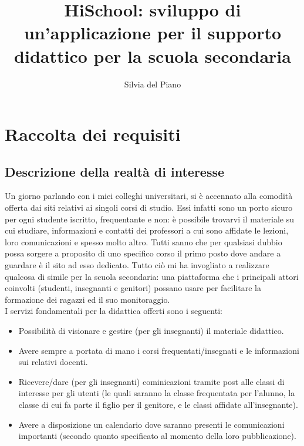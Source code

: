 \documentclass[Lau, binding=0.6cm, oneside]{sapthesis}
\title{HiSchool: sviluppo di un'applicazione per il supporto didattico per la scuola secondaria}
\author{Silvia del Piano}
\begin{document}
\frontmatter

\maketitle

\dedication{}

\tableofcontents

\mainmatter

\chapter{Raccolta dei requisiti}

\section{Descrizione della realtà di interesse}

Un giorno parlando con i miei colleghi universitari, si è accennato alla comodità offerta dai siti relativi ai singoli corsi di studio. Essi infatti sono un porto sicuro per ogni studente iscritto, frequentante e non: è possibile trovarvi il materiale su cui studiare, informazioni e contatti dei professori a cui sono affidate le lezioni, loro comunicazioni e spesso molto altro. Tutti sanno che per qualsiasi dubbio possa sorgere a proposito di uno specifico corso il primo posto dove andare a guardare è il sito ad esso dedicato. Tutto ciò mi ha invogliato a realizzare qualcosa di simile per la scuola secondaria: una piattaforma che i principali attori coinvolti (studenti, insegnanti e genitori) possano usare per facilitare la formazione dei ragazzi ed il suo monitoraggio.\\
I servizi fondamentali per la didattica offerti sono i seguenti:
\begin{itemize}
	\item Possibilità di visionare e gestire (per gli insegnanti) il materiale didattico.
	\item Avere sempre a portata di mano i corsi frequentati/insegnati e le informazioni sui relativi docenti.
	\item Ricevere/dare (per gli insegnanti) cominicazioni tramite post alle classi di interesse per gli utenti (le quali saranno la classe frequentata per l'alunno, la classe di cui fa parte il figlio per il genitore, e le classi affidate all'insegnante).
	\item Avere a disposizione un calendario dove saranno presenti le comunicazioni importanti (secondo quanto specificato al momento della loro pubblicazione).
\end{itemize}
\end{document}
